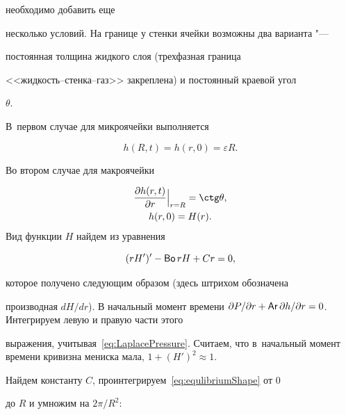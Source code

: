 необходимо добавить еще

несколько условий. На границе у стенки ячейки возможны два варианта "---

постоянная толщина жидкого слоя (трехфазная граница

<<жидкость--стенка--газ>> закреплена) и постоянный краевой угол

$\theta$. 

В~первом случае для микроячейки выполняется~\cite{Rieger} 

\begin{equation}

\label{eq:kol:new1}

h(R, t) = h(r, 0) = \varepsilon R.

\end{equation}

Во втором случае для макроячейки 

\begin{gather}

\label{eq:kol:new}

\frac{\partial h(r, t)}{\partial r}\Big|_{r=R} = \ctg \theta,\\ 

h(r, 0) = H(r).

\label{eq:kol:new2}

\end{gather} Вид функции $H$ найдем из уравнения



\begin{equation}\label{eq:equlibriumShape}

( rH' )'  - \Bo rH + Cr = 0,

\end{equation}

которое получено следующим образом (здесь штрихом обозначена

производная $dH/dr$). В начальный момент времени $\partial

P/\partial r + \Ar

\partial h/\partial r = 0$. Интегрируем левую и правую части этого

выражения, учитывая~\eqref{eq:LaplacePressure}. Считаем, что в~начальный момент времени кривизна мениска мала, $1+(H')^2\approx 1$.



Найдем константу $C$, проинтегрируем~\eqref{eq:equlibriumShape} от 0

до $R$ и умножим на $2\pi/R^2$:

$$

